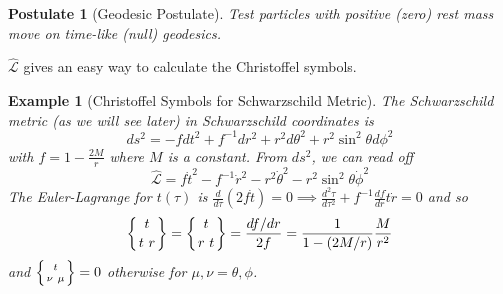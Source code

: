 \documentclass[a4paper]{article}
\newtheorem{post}{Postulate}[section]
\newtheorem{eg}{Example}[section]
\theoremstyle{new}
\begin{document}
\begin{post}[Geodesic Postulate]
Test particles with positive (zero) rest mass move on time-like (null) geodesics.
\end{post}
$\hat{\mathcal{L}}$ gives an easy way to calculate the Christoffel symbols.
\begin{eg}[Christoffel Symbols for Schwarzschild Metric]
The Schwarzschild metric (as we will see later) in Schwarzschild coordinates is
$$ds^2=-fdt^2+f^{-1}dr^2+r^2d\theta^2+r^2\sin^2\theta d\phi^2$$
with $f=1-\frac{2M}{r}$ where $M$ is a constant. From $ds^2$, we can read off 
$$\hat{\mathcal{L}}=f\dot{t}^2-f^{-1}\dot{r}^2-r^2\dot{\theta}^2-r^2\sin^2\theta\dot{\phi}^2$$
The Euler-Lagrange for $t(\tau)$ is $\frac{d}{d\tau}(2f\dot{t})=0\implies\frac{d^2\tau}{d\tau^2}+f^{-1}\frac{df}{dr}\dot{t}\dot{r}=0$ and so 
$$\left \{ {t \atop t\ r}\right\}=\left \{ {t \atop r\ t}\right\}=\frac{df/dr}{2f}=\frac{1}{1-(2M/r)}\frac{M}{r^2}$$
and $\left \{ {t \atop \nu\ \mu}\right\}=0$ otherwise for $\mu,\nu=\theta,\phi$.
\end{eg}
\newpage
\end{document}
